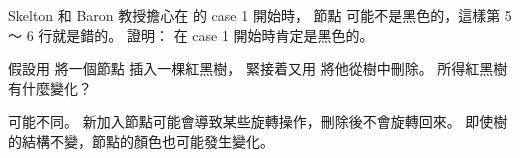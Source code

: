 \startANSWER
\TODO{}
\stopANSWER

\startEXERCISE
Skelton 和 Baron 教授擔心在  的 case 1 開始時，
節點  可能不是黑色的，這樣第 5 ～ 6 行就是錯的。
證明：  在 case 1 開始時肯定是黑色的。
\stopEXERCISE

\startANSWER
\TODO{}
\stopANSWER

\startEXERCISE
假設用  將一個節點  插入一棵紅黑樹，
緊接着又用  將他從樹中刪除。
所得紅黑樹有什麼變化？
\stopEXERCISE

\startANSWER
可能不同。
新加入節點可能會導致某些旋轉操作，刪除後不會旋轉回來。
即使樹的結構不變，節點的顏色也可能發生變化。
\stopANSWER

\stopsection

